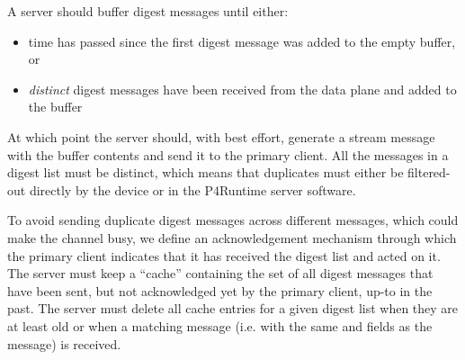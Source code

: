 \documentclass[11pt]{article}
\begin{document}
{%
\noindent{}A server should buffer digest messages until either:%

\begin{itemize}[noitemsep,topsep=\mdcompacttopsep]%

\item{} time has passed since the first digest message was added to
the empty buffer, or%

\item{} \emph{distinct} digest messages have been received from the
data plane and added to the buffer%
\end{itemize}%

\noindent{}At which point the server should, with best effort, generate a 
stream message with the buffer contents and send it to the primary client. All
the messages in a digest list must be distinct, which means that duplicates must
either be filtered-out directly by the device or in the P4Runtime server
software.%

To avoid sending duplicate digest messages across different 
messages, which could make the channel busy, we define an acknowledgement
mechanism through which the primary client indicates that it has received the
digest list and acted on it. The server must keep a \textquotedblleft{}cache\textquotedblright{} containing the set
of all digest messages that have been sent, but not acknowledged yet by the
primary client, up-to  in the past. The server must delete all
cache entries for a given digest list when they are at least 
old or when a matching  message (i.e. with the same 
and  fields as the  message) is received.%

}
\end{document}
